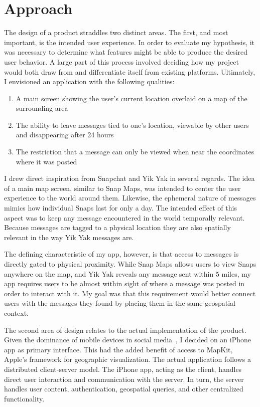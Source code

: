 \section{Approach}

The design of a product straddles two distinct areas. The first, and most important, is the intended user experience. In order to evaluate my hypothesis, it was necessary to determine what features might be able to produce the desired user behavior. A large part of this process involved deciding how my project would both draw from and differentiate itself from existing platforms. Ultimately, I envisioned an application with the following qualities:

\begin{enumerate}
    \item A main screen showing the user's current location overlaid on a map of the surrounding area
    \item The ability to leave messages tied to one's location, viewable by other users and disappearing after 24 hours
    \item The restriction that a message can only be viewed when near the coordinates where it was posted
\end{enumerate}

I drew direct inspiration from Snapchat and Yik Yak in several regards. The idea of a main map screen, similar to Snap Maps, was intended to center the user experience to the world around them. Likewise, the ephemeral nature of messages mimics how individual Snaps last for only a day. The intended effect of this aspect was to keep any message encountered in the world temporally relevant. Because messages are tagged to a physical location they are also spatially relevant in the way Yik Yak messages are.

The defining characteristic of my app, however, is that access to messages is directly gated to physical proximity. While Snap Maps allows users to view Snaps anywhere on the map, and Yik Yak reveals any message sent within 5 miles, my app requires users to be almost within sight of where a message was posted in order to interact with it. My goal was that this requirement would better connect users with the messages they found by placing them in the same geospatial context.

The second area of design relates to the actual implementation of the product. Given the dominance of mobile devices in social media~\cite{umaine_2021}, I decided on an iPhone app as primary interface. This had the added benefit of access to \textsf{MapKit}, Apple's framework for geographic visualization. The actual application follows a distributed client-server model. The iPhone app, acting as the client, handles direct user interaction and communication with the server. In turn, the server handles user content, authentication, geospatial queries, and other centralized functionality.
